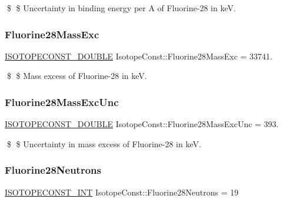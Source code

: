 \$ \$ Uncertainty in binding energy per A of Fluorine-\/28 in keV. \mbox{\label{group___isotope_const-_fluorine-_f28_ga99dbc5a99544d2d8442c8fefb44aa2b0}} 
\subsubsection{\texorpdfstring{Fluorine28\+Mass\+Exc}{Fluorine28MassExc}}
{\footnotesize\ttfamily \mbox{\hyperlink{group___isotope_const-_macros_ga8f45a7272ce02c0b4c65c44636ed719a}{I\+S\+O\+T\+O\+P\+E\+C\+O\+N\+S\+T\+\_\+\+D\+O\+U\+B\+LE}} Isotope\+Const\+::\+Fluorine28\+Mass\+Exc = 33741.}

\$ \$ Mass excess of Fluorine-\/28 in keV. \mbox{\label{group___isotope_const-_fluorine-_f28_ga500d2582beea399b455ff05090102289}} 
\subsubsection{\texorpdfstring{Fluorine28\+Mass\+Exc\+Unc}{Fluorine28MassExcUnc}}
{\footnotesize\ttfamily \mbox{\hyperlink{group___isotope_const-_macros_ga8f45a7272ce02c0b4c65c44636ed719a}{I\+S\+O\+T\+O\+P\+E\+C\+O\+N\+S\+T\+\_\+\+D\+O\+U\+B\+LE}} Isotope\+Const\+::\+Fluorine28\+Mass\+Exc\+Unc = 393.}

\$ \$ Uncertainty in mass excess of Fluorine-\/28 in keV. \mbox{\label{group___isotope_const-_fluorine-_f28_ga1a5ea02af390ccd232a020f1907dba55}} 
\subsubsection{\texorpdfstring{Fluorine28\+Neutrons}{Fluorine28Neutrons}}
{\footnotesize\ttfamily \mbox{\hyperlink{group___isotope_const-_macros_ga5f18360b3e99483a35c32d789e62621c}{I\+S\+O\+T\+O\+P\+E\+C\+O\+N\+S\+T\+\_\+\+I\+NT}} Isotope\+Const\+::\+Fluorine28\+Neutrons = 19}

